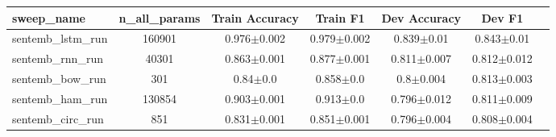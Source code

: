 \begin{tabular}{lcccccc}
\toprule
sweep_name & n_all_params & Train Accuracy & Train F1 & Dev Accuracy & Dev F1 \\
\midrule
sentemb_lstm_run & 160901 & 0.976$\pm$0.002 & 0.979$\pm$0.002 & 0.839$\pm$0.01 & 0.843$\pm$0.01 \\
sentemb_rnn_run & 40301 & 0.863$\pm$0.001 & 0.877$\pm$0.001 & 0.811$\pm$0.007 & 0.812$\pm$0.012 \\
sentemb_bow_run & 301 & 0.84$\pm$0.0 & 0.858$\pm$0.0 & 0.8$\pm$0.004 & 0.813$\pm$0.003 \\
sentemb_ham_run & 130854 & 0.903$\pm$0.001 & 0.913$\pm$0.0 & 0.796$\pm$0.012 & 0.811$\pm$0.009 \\
sentemb_circ_run & 851 & 0.831$\pm$0.001 & 0.851$\pm$0.001 & 0.796$\pm$0.004 & 0.808$\pm$0.004 \\
\bottomrule
\end{tabular}
